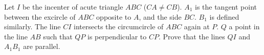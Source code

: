 Let $I$ be the incenter of acute triangle $ABC$ ($CA \neq CB$). $A_1$ is the tangent point between the excircle of $ABC$ opposite to $A$, and the side $BC$. $B_1$ is defined similarly. The line $CI$ intersects the circumcircle of $ABC$ again at $P$. $Q$ a point in the line $AB$ such that $QP$ is perpendicular to $CP$. Prove that the lines $QI$ and $A_1B_1$ are parallel.